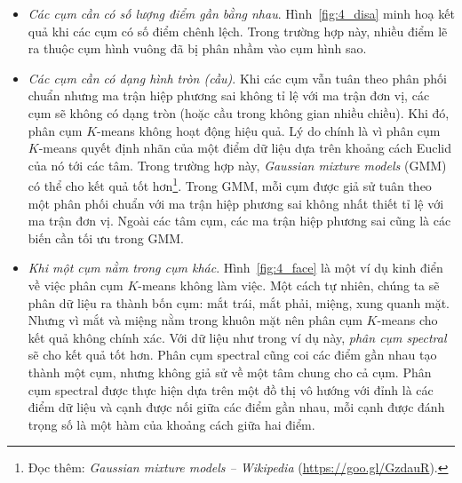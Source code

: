 \begin{itemize}
    được khởi tạo khác nhau. Ta cũng thấy rằng trường hợp (a) và (b) cho kết quả
    tốt, trong khi kết quả thu được ở trường hợp (c) không thực sự tốt. Một điểm
    nữa có thể rút ra là số lượng vòng lặp tới khi thuật toán hội tụ cũng khác
    nhau. Trường hợp (a) và (b) cùng cho kết quả tốt nhưng (b) chạy trong thời
    gian gần gấp đôi. Một kỹ thuật giúp hạn chế nghiệm xấu như trường hợp (c) là
    chạy thuật toán phân cụm $K$-means nhiều lần với các tâm cụm được khởi tạo
    khác nhau và chọn ra lần chạy cho giá trị hàm mất mát thấp nhất\footnote{\textit{KMeans -- scikit-learn} (\url{https://goo.gl/5KavVn}).}. Ngoài ra, có một vài thuật toán giúp chọn các tâm cụm ban đầu~\cite{khan2004cluster},
    Kmeans++~\cite{arthur2007k,bahmani2012scalable}.
  
    \item \textit{Các cụm cần có số lượng điểm gần bằng nhau}.
    Hình~\ref{fig:4_disa} minh hoạ kết quả khi các cụm có số điểm
    chênh lệch. Trong trường hợp này, nhiều điểm lẽ ra thuộc cụm hình vuông đã bị phân nhầm vào cụm hình sao. 

    \item \textit{Các cụm cần có dạng hình tròn (cầu)}.
    Khi các cụm vẫn tuân theo phân phối chuẩn nhưng ma trận hiệp phương sai
    không tỉ lệ với ma trận đơn vị, các cụm sẽ không có dạng tròn
    (hoặc cầu trong không gian nhiều chiều). Khi đó, phân cụm $K$-means không hoạt động hiệu quả. Lý do chính là vì phân cụm $K$-means quyết định
    nhãn của một điểm dữ liệu dựa trên khoảng cách Euclid của nó tới các
    tâm. Trong trường hợp này, \textit{Gaussian mixture models} (GMM)~\cite{reynolds2015gaussian} có thể cho kết quả tốt hơn\footnote{Đọc thêm:
    \textit{Gaussian mixture models -- Wikipedia} (\url{https://goo.gl/GzdauR}).}. Trong GMM, mỗi cụm được giả sử tuân theo một phân phối chuẩn với ma trận hiệp phương sai không nhất thiết tỉ lệ với ma trận đơn vị. Ngoài các tâm cụm, các ma trận hiệp phương sai cũng là các biến cần tối ưu trong GMM. 
    

    \item \textit{Khi một cụm nằm trong cụm khác}.
    Hình~\ref{fig:4_face} là một ví dụ kinh điển về việc phân cụm $K$-means
    không làm việc. Một cách tự nhiên, chúng ta sẽ phân dữ liệu ra thành bốn
    cụm: mắt trái, mắt phải, miệng, xung quanh mặt. Nhưng vì mắt và miệng nằm
    trong khuôn mặt nên phân cụm $K$-means cho kết quả không chính xác. Với dữ
    liệu như trong ví dụ này, \textit{phân cụm
    spectral}~\cite{von2007tutorial,ng2002spectral} sẽ cho kết quả tốt hơn. Phân
    cụm spectral cũng coi các điểm gần nhau tạo thành một cụm, nhưng không giả
    sử về một tâm chung cho cả cụm. Phân cụm spectral được thực hiện dựa trên
    một đồ thị vô hướng với đỉnh là các điểm dữ liệu và cạnh được nối giữa các
    điểm gần nhau, mỗi cạnh được đánh trọng số là một hàm của khoảng cách giữa
    hai điểm.
  

\end{itemize}


